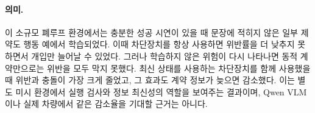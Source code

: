 \paragraph{의미.}
이 소규모 폐루프 환경에서는 충분한 성공 시연이 있을 때 문장에 적히지 않은 일부 제약도 행동 예에서 학습되었다. 이때 차단장치를 항상 사용하면 위반률을 더 낮추지 못하면서 개입만 늘어날 수 있었다. 그러나 학습하지 않은 위험이 다시 나타나면 동적 계약만으로는 위반을 모두 막지 못했다. 최신 상태를 사용하는 차단장치를 함께 사용했을 때 위반과 충돌이 가장 크게 줄었고, 그 효과도 계약 정보가 늦으면 감소했다. 이는 별도 미시 환경에서 실행 검사와 정보 최신성의 역할을 보여주는 결과이며, Qwen VLM이나 실제 차량에서 같은 감소율을 기대할 근거는 아니다.
